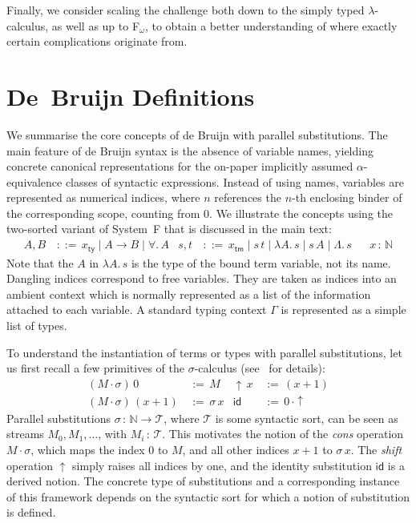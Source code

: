\documentclass[a4paper,UKenglish]{lipics-v2016}
\newcommand{\ms}{\,}
\newcommand{\mrel}[1]{\mathrel{\ms #1 \ms}}
\newcommand{\Nat}{\mathbb{N}}
\newcommand{\OF}{\mrel{:}}
\newcommand{\bnfdef}{\mrel{::=}}
\newcommand{\eqdef}{\mrel{:=}}
\newcommand{\ty}{\mathsf{ty}}
\newcommand{\tm}{\mathsf{tm}}
\newcommand{\All}{\ensuremath{\forall.\,}}
\newcommand{\Lam}[1]{\ensuremath{\lambda #1.\,}}
\newcommand{\TyLam}{\ensuremath{\Lambda.\,}}
\newcommand{\scons}{\mathbin{\cdot}}
\newcommand{\id}{\mathsf{id}}
\newcommand{\shift}{\ensuremath{\uparrow}}
\theoremstyle{plain}
\begin{document}
Finally, we consider scaling the challenge both down to the simply typed $\lambda$-calculus, as well as up to F$_\omega$, to obtain a better understanding of where exactly certain complications originate from.

\appendix

\section{De~Bruijn Definitions}
\label{apdx:db}

We summarise the core concepts of de Bruijn with parallel substitutions.
The main feature of de Bruijn syntax is the absence of variable names, yielding concrete canonical representations for the on-paper implicitly assumed $\alpha$-equivalence classes of syntactic expressions.
Instead of using names, variables are represented as numerical indices, where $n$ references the $n$-th enclosing binder of the corresponding scope, counting from $0$.
We illustrate the concepts using the two-sorted variant of System~F that is discussed in the main text:
\begin{align*}
  A, B &\bnfdef x_\ty \mid A \to B \mid \All A & s, t &\bnfdef x_\tm \mid s\,t \mid \Lam A s \mid s\,A \mid \TyLam s & &x \OF \Nat
\end{align*}
Note that the $A$ in $\Lam A s$ is the type of the bound term variable, not its name.
Dangling indices correspond to free variables.
They are taken as indices into an ambient context which is normally represented as a list of the information attached to each variable.
A standard typing context $\Gamma$ is represented as a simple list of types.

To understand the instantiation of terms or types with parallel substitutions, let us first recall a few primitives of the $\sigma$-calculus (see~\cite{abadi1991} for details):
\begin{align*}
  (M \scons \sigma)\,0 &\eqdef M & \shift\,x&\eqdef (x + 1)\\
  (M \scons \sigma)\,(x + 1) &\eqdef \sigma\,x & \id &\eqdef 0\,\scons \shift
\end{align*}
Parallel substitutions $\sigma \OF \Nat \to \mathcal{T}$, where $\mathcal{T}$ is some syntactic sort, can be seen as streams $M_0, M_1, \ldots $, with $M_i \OF \mathcal{T}$.
This motivates the notion of the \emph{cons} operation $M \scons \sigma$, which maps the index 0 to $M$, and all other indices $x + 1$ to $\sigma\,x$.
The \emph{shift} operation $\shift$ simply raises all indices by one, and the identity substitution $\id$ is a derived notion.
The concrete type of substitutions and a corresponding instance of this framework depends on the syntactic sort for which a notion of substitution is defined.
\end{document}
